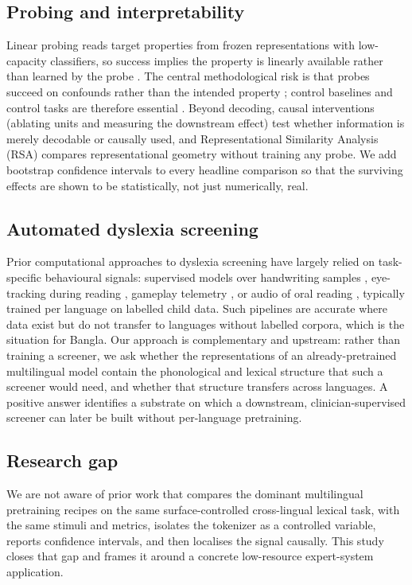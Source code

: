 \documentclass[preprint,12pt]{elsarticle}
\begin{document}
\subsection{Probing and interpretability}
Linear probing reads target properties from frozen representations with low-capacity classifiers, so success implies the property is linearly available rather than learned by the probe \cite{alain2017probes,conneau2018probing,hewitt2019structural,belinkov2022probing}. The central methodological risk is that probes succeed on confounds rather than the intended property \cite{belinkov2022probing,pimentel2020information}; control baselines and control tasks are therefore essential \cite{hewitt2019control}. Beyond decoding, causal interventions (ablating units and measuring the downstream effect) \cite{vig2020causal,meng2022rome} test whether information is merely decodable or causally used, and Representational Similarity Analysis (RSA) \cite{kriegeskorte2008rsa} compares representational geometry without training any probe. We add bootstrap confidence intervals \cite{efron1994bootstrap} to every headline comparison so that the surviving effects are shown to be statistically, not just numerically, real.

\subsection{Automated dyslexia screening}
Prior computational approaches to dyslexia screening have largely relied on task-specific behavioural signals: supervised models over handwriting samples \cite{spoon2019handwriting}, eye-tracking during reading \cite{benfatto2016eyetracking}, gameplay telemetry \cite{rello2020gamified}, or audio of oral reading \cite{tas2023audio}, typically trained per language on labelled child data. Such pipelines are accurate where data exist but do not transfer to languages without labelled corpora, which is the situation for Bangla. Our approach is complementary and upstream: rather than training a screener, we ask whether the representations of an already-pretrained multilingual model contain the phonological and lexical structure that such a screener would need, and whether that structure transfers across languages. A positive answer identifies a substrate on which a downstream, clinician-supervised screener can later be built without per-language pretraining.

\subsection{Research gap}
We are not aware of prior work that compares the dominant multilingual pretraining recipes on the same surface-controlled cross-lingual lexical task, with the same stimuli and metrics, isolates the tokenizer as a controlled variable, reports confidence intervals, and then localises the signal causally. This study closes that gap and frames it around a concrete low-resource expert-system application.
\end{document}
